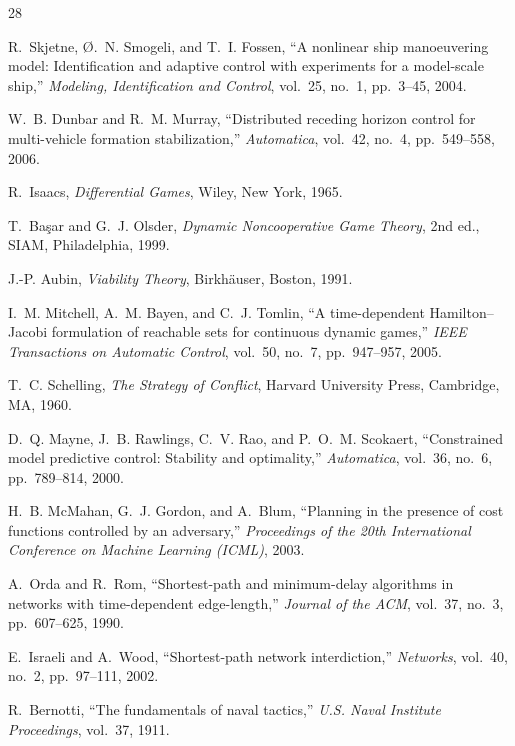\documentclass[12pt,a4paper]{article}
\begin{document}

\begin{thebibliography}{28}

R.~Skjetne, \O.~N. Smogeli, and T.~I. Fossen, ``A nonlinear ship
manoeuvering model: Identification and adaptive control with experiments for
a model-scale ship,'' \emph{Modeling, Identification and Control}, vol.~25,
no.~1, pp.~3--45, 2004.

W.~B. Dunbar and R.~M. Murray, ``Distributed receding horizon control for
multi-vehicle formation stabilization,'' \emph{Automatica}, vol.~42, no.~4,
pp.~549--558, 2006.

R.~Isaacs, \emph{Differential Games}, Wiley, New York, 1965.

T.~Ba{\c s}ar and G.~J. Olsder, \emph{Dynamic Noncooperative Game
Theory}, 2nd ed., SIAM, Philadelphia, 1999.

J.-P. Aubin, \emph{Viability Theory}, Birkh\"auser, Boston, 1991.

I.~M. Mitchell, A.~M. Bayen, and C.~J. Tomlin, ``A time-dependent
Hamilton--Jacobi formulation of reachable sets for continuous dynamic
games,'' \emph{IEEE Transactions on Automatic Control}, vol.~50, no.~7,
pp.~947--957, 2005.

T.~C. Schelling, \emph{The Strategy of Conflict}, Harvard University
Press, Cambridge, MA, 1960.

D.~Q. Mayne, J.~B. Rawlings, C.~V. Rao, and P.~O.~M. Scokaert,
``Constrained model predictive control: Stability and optimality,''
\emph{Automatica}, vol.~36, no.~6, pp.~789--814, 2000.

H.~B. McMahan, G.~J. Gordon, and A.~Blum, ``Planning in the presence of
cost functions controlled by an adversary,'' \emph{Proceedings of the
20th International Conference on Machine Learning (ICML)}, 2003.

A.~Orda and R.~Rom, ``Shortest-path and minimum-delay algorithms in
networks with time-dependent edge-length,'' \emph{Journal of the ACM},
vol.~37, no.~3, pp.~607--625, 1990.

E.~Israeli and A.~Wood, ``Shortest-path network interdiction,''
\emph{Networks}, vol.~40, no.~2, pp.~97--111, 2002.

R.~Bernotti, ``The fundamentals of naval tactics,'' \emph{U.S. Naval
Institute Proceedings}, vol.~37, 1911.


\end{thebibliography}
\end{document}

